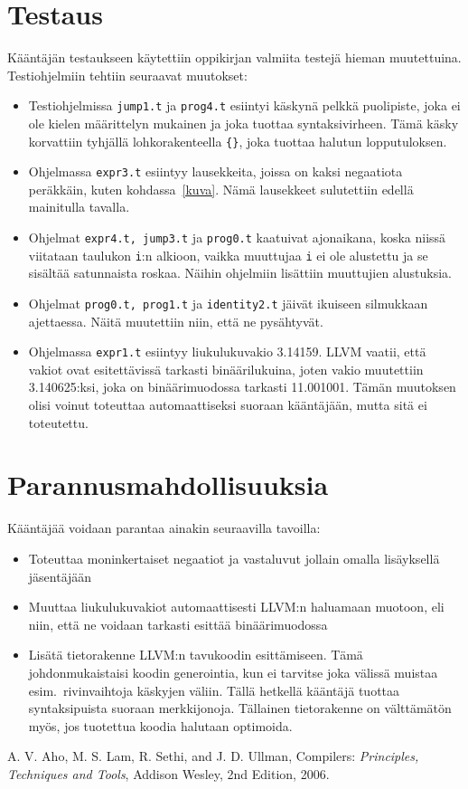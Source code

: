 \documentclass[12pt]{article}
\newcommand{\code}{\texttt}
\begin{document}
\section{Testaus}
Kääntäjän testaukseen käytettiin oppikirjan valmiita testejä hieman muutettuina. 
Testiohjelmiin tehtiin seuraavat muutokset:
\begin{itemize}
\item Testiohjelmissa \code{jump1.t} ja \code{prog4.t} esiintyi käskynä pelkkä puolipiste, 
joka ei ole kielen määrittelyn mukainen ja joka tuottaa syntaksivirheen. Tämä käsky korvattiin 
tyhjällä lohkorakenteella \code{\{\}}, joka tuottaa halutun lopputuloksen.

\item Ohjelmassa \code{expr3.t} esiintyy lausekkeita, joissa on kaksi negaatiota peräk\-käin, kuten 
kohdassa~\ref{kuva}. Nämä lausekkeet sulutettiin edellä mainitulla tavalla. 

\item Ohjelmat \code{expr4.t, jump3.t} ja \code{prog0.t} kaatuivat ajonaikana, koska niissä 
viitataan taulukon \code{i}:n alkioon, vaikka muuttujaa \code{i} ei ole alustettu ja se 
sisältää satunnaista roskaa. Näihin ohjelmiin lisättiin muuttujien alustuksia.

\item Ohjelmat \code{prog0.t, prog1.t} ja \code{identity2.t} jäivät ikuiseen silmukkaan ajettaessa. 
Näitä muutettiin niin, että ne pysähtyvät.

\item Ohjelmassa \code{expr1.t} esiintyy liukulukuvakio 3.14159. LLVM vaatii, että vakiot ovat 
esitettävissä tarkasti binäärilukuina, joten vakio muutettiin 3.140625:ksi, joka on 
binäärimuodossa tarkasti 11.001001. Tämän muutoksen olisi voinut toteuttaa automaattiseksi suoraan 
kääntäjään, mutta sitä ei toteutettu. 
\end{itemize}

\section{Parannusmahdollisuuksia}
Kääntäjää voidaan parantaa ainakin seuraavilla tavoilla:
\begin{itemize}
\item Toteuttaa moninkertaiset negaatiot ja vastaluvut jollain omalla lisäyksellä 
jäsentäjään

\item Muuttaa liukulukuvakiot automaattisesti LLVM:n haluamaan muotoon, eli niin, että 
ne voidaan tarkasti esittää binäärimuodossa

\item Lisätä tietorakenne LLVM:n tavukoodin esittämiseen. Tämä johdonmukais\-taisi koodin 
generointia, kun ei tarvitse joka välissä muistaa esim.\ rivinvaihtoja käskyjen väliin. 
Tällä hetkellä kääntäjä tuottaa syntaksipuista suoraan merkkijonoja. Tällainen tietorakenne 
on välttämätön myös, jos tuotettua koodia halutaan optimoida. 
\end{itemize}

\begin{thebibliography}{9}
  A. V. Aho, M. S. Lam, R. Sethi, and J. D. Ullman,
  Compilers: \emph{Principles, Techniques and Tools}, 
  Addison Wesley,
  2nd Edition,
  2006.
\end{thebibliography}
\end{document}
